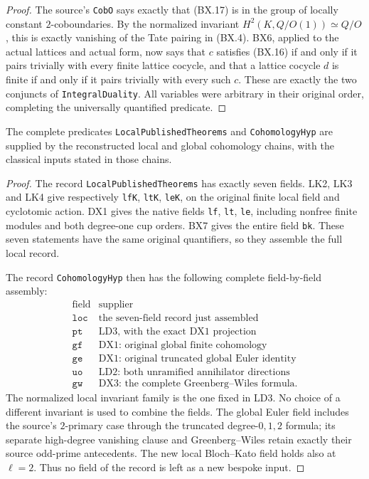 \begin{proof}
The source's \texttt{Cob\allowbreak O} says exactly that (BX.17) is
in the group of locally constant $2$-coboundaries.
By the normalized invariant
$H^2(K,Q/O(1))\simeq Q/O$, this is exactly vanishing
of the Tate pairing in (BX.4).  BX6, applied to the
actual lattices and actual form, now says that $c$
satisfies (BX.16) if and only if it pairs trivially
with every finite lattice cocycle, and that a lattice
cocycle $d$ is finite if and only if it pairs trivially
with every such $c$.  These are exactly the two
conjuncts of \texttt{Integral\allowbreak Duality}.  All variables
were arbitrary in their original order, completing
the universally quantified predicate.
\end{proof}

\begin{theorem}
\label{claim:BX8}
The complete predicates \texttt{Local\allowbreak Published\allowbreak Theorems}
and \texttt{Cohomology\allowbreak Hyp} are supplied by the reconstructed
local and global cohomology chains, with the classical
inputs stated in those chains.
\end{theorem}
\begin{proof}
The record \texttt{Local\allowbreak Published\allowbreak Theorems} has exactly
seven fields.  LK2, LK3 and LK4 give respectively
\texttt{lf\allowbreak K}, \texttt{lt\allowbreak K}, \texttt{le\allowbreak K}, on the original
finite local field and cyclotomic action.  DX1 gives
the native fields \texttt{lf}, \texttt{lt}, \texttt{le},
including nonfree finite modules and both degree-one
cup orders.  BX7 gives the entire field \texttt{bk}.
These seven statements have the same original
quantifiers, so they assemble the full local record.

The record \texttt{Cohomology\allowbreak Hyp} then has the following
complete field-by-field assembly:
\[
\begin{array}{c|l}
\text{field}&\text{supplier}\\ \hline
\texttt{loc}&\text{the seven-field record just assembled}\\
\texttt{pt}&\text{LD3, with the exact DX1 projection}\\
\texttt{gf}&\text{DX1: original global finite cohomology}\\
\texttt{ge}&\text{DX1: original truncated global Euler identity}\\
\texttt{uo}&\text{LD2: both unramified annihilator directions}\\
\texttt{gw}&\text{DX3: the complete Greenberg--Wiles formula}.
\end{array}                                                     \tag{BX.18}
\]
The normalized local invariant family is the one fixed
in LD3.  No choice of a different invariant is used to
combine the fields.  The global Euler field includes
the source's $2$-primary case through the truncated
degree-$0,1,2$ formula; its separate high-degree
vanishing clause and Greenberg--Wiles retain exactly
their source odd-prime antecedents.  The new local
Bloch--Kato field holds also at $\ell=2$.
Thus no field of the record is left as a new
bespoke input.
\end{proof}

